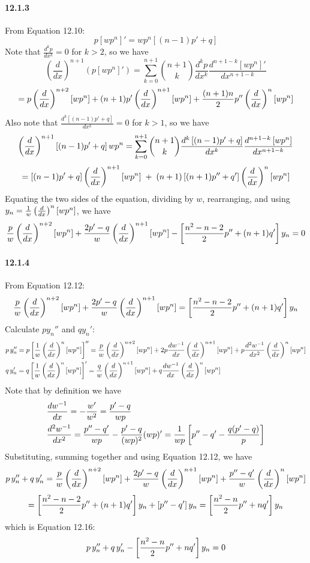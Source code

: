 \documentclass[a4paper]{article}
\begin{document}
\paragraph{12.1.3}
From Equation 12.10:
\[
p\left[wp^n\right]'=wp^n\left[(n-1)p'+q\right]
\]
Note that $\frac{d^kp}{dx^k}=0$ for $k>2$, so we have
\[
\left(\frac{d}{dx} \right)^{n+1}\left(p\left[wp^n\right]' \right)=\sum_{k=0}^{n+1}\binom{n+1}{k}\frac{d^kp}{dx^k}\frac{d^{n+1-k}\left[wp^n\right]'}{dx^{n+1-k}}
\]
\[
=p\left(\frac{d}{dx}\right)^{n+2}\left[wp^n\right]+(n+1)p'\left(\frac{d}{dx}\right)^{n+1}\left[wp^n\right]+\frac{(n+1)n}{2}p''\left(\frac{d}{dx}\right)^n\left[wp^n\right]
\]
Also note that $\frac{d^k[(n-1)p'+q]}{dx^k}=0$ for $k>1$, so we have
\[
\left(\frac{d}{dx}\right)^{n+1}\left[(n-1)p'+q\right]wp^n=\sum_{k=0}^{n+1}\binom{n+1}{k}\frac{d^k\left[(n-1)p'+q\right]}{dx^k}\frac{d^{n+1-k}\left[wp^n\right]}{dx^{n+1-k}}
\]
\[
=\left[(n-1)p'+q\right]\left(\frac{d}{dx}\right)^{n+1}\left[wp^n\right]\;+\;(n+1)\left[(n+1)p''+q'\right]\left(\frac{d}{dx}\right)^n\left[wp^n\right]
\]
Equating the two sides of the equation, dividing by $w$, rearranging, and using $y_n=\frac{1}{w}\left(\frac{d}{dx}\right)^n\left[wp^n\right]$, we have
\[
\frac{p}{w}\left(\frac{d}{dx}\right)^{n+2}\left[wp^n\right]+\frac{2p'-q}{w}\left(\frac{d}{dx}\right)^{n+1}\left[wp^n\right]-\left[\frac{n^2-n-2}{2}p''+(n+1)q'\right]y_n=0
\]

\paragraph{12.1.4}
From Equation 12.12:
\[
\frac{p}{w}\left(\frac{d}{dx}\right)^{n+2}\left[wp^n\right]+\frac{2p'-q}{w}\left(\frac{d}{dx}\right)^{n+1}\left[wp^n\right]=\left[\frac{n^2-n-2}{2}p''+(n+1)q'\right]y_n
\]
Calculate $py_n''$ and $qy_n'$:
\begin{align*}
    & p\,y_n''=p\left[\frac{1}{w}\left(\frac{d}{dx}\right)^n\left[wp^n\right]\right]''=\frac{p}{w}\left(\frac{d}{dx}\right)^{n+2}\left[wp^n\right]+2p\frac{dw^{-1}}{dx}\left(\frac{d}{dx}\right)^{n+1}\left[wp^n\right]+p\frac{d^2w^{-1}}{dx^2}\left(\frac{d}{dx}\right)^n\left[wp^n\right]\\
    & q\,y_n'=q\left[\frac{1}{w}\left(\frac{d}{dx}\right)^n\left[wp^n\right]\right]'=\frac{q}{w}\left(\frac{d}{dx}\right)^{n+1}\left[wp^n\right]+q\frac{dw^{-1}}{dx}\left(\frac{d}{dx}\right)^n\left[wp^n\right]
\end{align*}
Note that by definition we have
\begin{align*}
    & \frac{dw^{-1}}{dx}=-\frac{w'}{w^2}=\frac{p'-q}{wp}\\
    & \frac{d^2w^{-1}}{dx^2}=\frac{p''-q'}{wp}-\frac{p'-q}{(wp)^2}(wp)'=\frac{1}{wp}\left[p''-q'-\frac{q(p'-q)}{p}\right]
\end{align*}
Substituting, summing together and using Equation 12.12, we have
\[
p\,y_n''+q\,y_n'=\frac{p}{w}\left(\frac{d}{dx}\right)^{n+2}\left[wp^n\right]+\frac{2p'-q}{w}\left(\frac{d}{dx}\right)^{n+1}\left[wp^n\right]+\frac{p''-q'}{w}\left(\frac{d}{dx}\right)^n\left[wp^n\right]
\]
\[
=\left[\frac{n^2-n-2}{2}p''+(n+1)q'\right]y_n+\left[p''-q'\right]y_n=\left[\frac{n^2-n}{2}p''+nq'\right]y_n
\]
which is Equation 12.16:
\[
p\,y_n''+q\,y_n'-\left[\frac{n^2-n}{2}p''+nq'\right]y_n=0
\]
\end{document}
